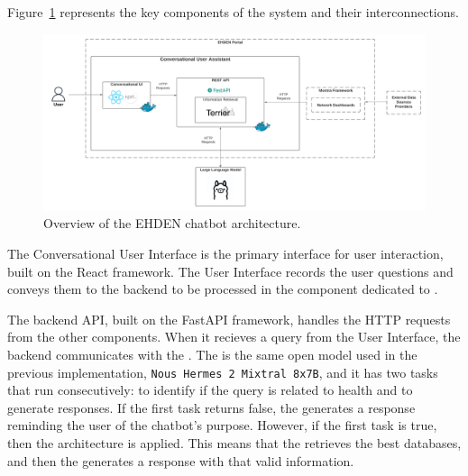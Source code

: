 Figure~\ref{fig_arch} represents the key components of the system and their interconnections.

\begin{figure}[H]
    \includegraphics[width=1\textwidth]{figs/chapter3/architecture.png}
    \centering
    \caption{Overview of the EHDEN chatbot architecture.}
    \label{fig_arch}
\end{figure}

The Conversational User Interface is the primary interface for user interaction, built on the React framework. The User Interface records the user questions and conveys them to the backend to be processed in the component dedicated to {\ir}. 

The backend API, built on the FastAPI framework, handles the HTTP requests from the other components. When it recieves a query from the User Interface, the backend communicates with the {\llm}. The {\llm} is the same open model used in the previous implementation, \texttt{Nous Hermes 2 Mixtral 8x7B}, and it has two tasks that run consecutively: to identify if the query is related to health and to generate responses. If the first task returns false, the {\llm} generates a response reminding the user of the chatbot's purpose. However, if the first task is true, then the {\rag} architecture is applied. This means that the {\bm} retrieves the best databases, and then the {\llm} generates a response with that valid information.

